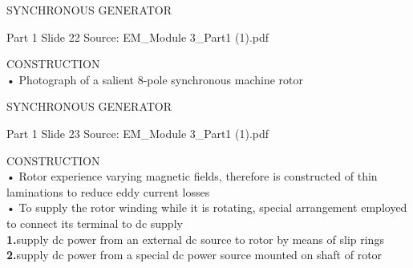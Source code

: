 \documentclass[11pt,a4paper]{article}
\begin{document}
\begin{mdframed}[roundcorner=9pt,backgroundcolor=white,linecolor=anthOrange,linewidth=1pt,innerleftmargin=12pt,innerrightmargin=12pt,innertopmargin=10pt,innerbottommargin=10pt,skipabove=8pt,skipbelow=10pt]
{\HeadingFont\fontsize{15}{18}\selectfont\color{anthDark}SYNCHRONOUS GENERATOR\par}
{\color{anthMid}\small Part 1 \textbullet{} Slide 22 \textbullet{} Source: EM\_Module 3\_Part1 (1).pdf\par}
\vspace{0.5em}
{\small
CONSTRUCTION\\
• Photograph of a salient 8-pole synchronous machine rotor\\

}
\end{mdframed}

\begin{mdframed}[roundcorner=9pt,backgroundcolor=white,linecolor=anthBlue,linewidth=1pt,innerleftmargin=12pt,innerrightmargin=12pt,innertopmargin=10pt,innerbottommargin=10pt,skipabove=8pt,skipbelow=10pt]
{\HeadingFont\fontsize{15}{18}\selectfont\color{anthDark}SYNCHRONOUS GENERATOR\par}
{\color{anthMid}\small Part 1 \textbullet{} Slide 23 \textbullet{} Source: EM\_Module 3\_Part1 (1).pdf\par}
\vspace{0.5em}
{\small
CONSTRUCTION\\
• Rotor experience varying magnetic fields, therefore is constructed of thin laminations to reduce eddy current losses\\
• To supply the rotor winding while it is rotating, special arrangement employed to connect its terminal to dc supply\\
\textcolor{anthBlue}{\textbf{1.}}\hspace{0.5em}supply dc power from an external dc source to rotor by means of slip rings\\
\textcolor{anthBlue}{\textbf{2.}}\hspace{0.5em}supply dc power from a special dc power source mounted on shaft of rotor\\

}
\end{mdframed}
\end{document}
